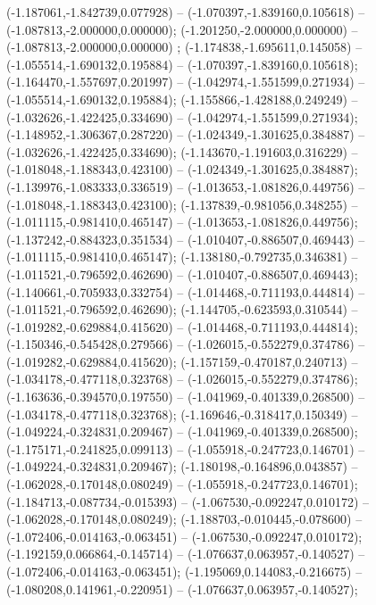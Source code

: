  (-1.187061,-1.842739,0.077928) -- (-1.070397,-1.839160,0.105618) -- (-1.087813,-2.000000,0.000000);
 (-1.201250,-2.000000,0.000000) -- (-1.087813,-2.000000,0.000000) ;
 (-1.174838,-1.695611,0.145058) -- (-1.055514,-1.690132,0.195884) -- (-1.070397,-1.839160,0.105618);
 (-1.164470,-1.557697,0.201997) -- (-1.042974,-1.551599,0.271934) -- (-1.055514,-1.690132,0.195884);
 (-1.155866,-1.428188,0.249249) -- (-1.032626,-1.422425,0.334690) -- (-1.042974,-1.551599,0.271934);
 (-1.148952,-1.306367,0.287220) -- (-1.024349,-1.301625,0.384887) -- (-1.032626,-1.422425,0.334690);
 (-1.143670,-1.191603,0.316229) -- (-1.018048,-1.188343,0.423100) -- (-1.024349,-1.301625,0.384887);
 (-1.139976,-1.083333,0.336519) -- (-1.013653,-1.081826,0.449756) -- (-1.018048,-1.188343,0.423100);
 (-1.137839,-0.981056,0.348255) -- (-1.011115,-0.981410,0.465147) -- (-1.013653,-1.081826,0.449756);
 (-1.137242,-0.884323,0.351534) -- (-1.010407,-0.886507,0.469443) -- (-1.011115,-0.981410,0.465147);
 (-1.138180,-0.792735,0.346381) -- (-1.011521,-0.796592,0.462690) -- (-1.010407,-0.886507,0.469443);
 (-1.140661,-0.705933,0.332754) -- (-1.014468,-0.711193,0.444814) -- (-1.011521,-0.796592,0.462690);
 (-1.144705,-0.623593,0.310544) -- (-1.019282,-0.629884,0.415620) -- (-1.014468,-0.711193,0.444814);
 (-1.150346,-0.545428,0.279566) -- (-1.026015,-0.552279,0.374786) -- (-1.019282,-0.629884,0.415620);
 (-1.157159,-0.470187,0.240713) -- (-1.034178,-0.477118,0.323768) -- (-1.026015,-0.552279,0.374786);
 (-1.163636,-0.394570,0.197550) -- (-1.041969,-0.401339,0.268500) -- (-1.034178,-0.477118,0.323768);
 (-1.169646,-0.318417,0.150349) -- (-1.049224,-0.324831,0.209467) -- (-1.041969,-0.401339,0.268500);
 (-1.175171,-0.241825,0.099113) -- (-1.055918,-0.247723,0.146701) -- (-1.049224,-0.324831,0.209467);
 (-1.180198,-0.164896,0.043857) -- (-1.062028,-0.170148,0.080249) -- (-1.055918,-0.247723,0.146701);
 (-1.184713,-0.087734,-0.015393) -- (-1.067530,-0.092247,0.010172) -- (-1.062028,-0.170148,0.080249);
 (-1.188703,-0.010445,-0.078600) -- (-1.072406,-0.014163,-0.063451) -- (-1.067530,-0.092247,0.010172);
 (-1.192159,0.066864,-0.145714) -- (-1.076637,0.063957,-0.140527) -- (-1.072406,-0.014163,-0.063451);
 (-1.195069,0.144083,-0.216675) -- (-1.080208,0.141961,-0.220951) -- (-1.076637,0.063957,-0.140527);
